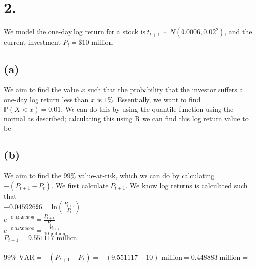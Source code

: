 \documentclass{article}
\begin{document}
\section*{2.}
{\Large

We model the one-day log return for a stock is $t_{t+1} \sim N(0.0006, 0.02^2)$, and the current investment $P_t = \$ 10$ million.

\subsection*{(a)}

We aim to find the value $x$ such that the probability that the investor suffers a one-day log return less than $x$ is $1\%$. Essentially, we want to find $\mathbb{P}(X < x) = 0.01$. We can do this by using the quantile function using the normal as described; calculating this using R we can find this log return value to be 


\subsection*{(b)}

We aim to find the 99\% value-at-risk, which we can do by calculating $-(P_{t+1} - P_t)$. We first calculate $P_{t+1}$. We know log returns is calculated such that \\
$-0.04592696 = \text{ln}(\frac{P_{t+1}}{P_t})$ \\
$e^{-0.04592696} = \frac{P_{t+1}}{P_t}$ \\ 
$e^{-0.04592696} = \frac{P_{t+1}}{10 \text{ million}}$ \\ 
$P_{t+1} = 9.551117 \text{ million}$ \\ \\
$99\% \text{ VAR} = -(P_{t+1} - P_t) = -(9.551117 - 10) \text{ million} = 0.448883 \text{ million} = $ 

}
\end{document}
